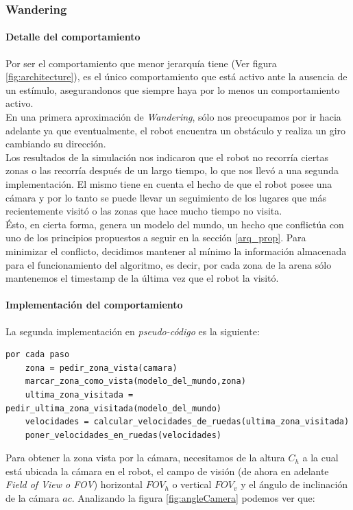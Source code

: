\subsubsection{Wandering}
\label{wandering}

\paragraph{Detalle del comportamiento} 
Por ser el comportamiento que menor jerarqu\'ia tiene (Ver figura
\ref{fig:architecture}), es el \'unico comportamiento que est\'a activo
ante la ausencia de un est\'imulo, asegurandonos que siempre haya por lo menos
un comportamiento activo.
\\
En una primera aproximaci\'on de \emph{Wandering}, s\'olo nos preocupamos por
ir hacia adelante ya que eventualmente, el robot encuentra un obst\'aculo y
realiza un giro cambiando su direcci\'on.
\\
Los resultados de la simulaci\'on nos indicaron que el robot no recorr\'ia
ciertas zonas o las recorr\'ia despu\'es de un largo tiempo, lo que nos llev\'o
a una segunda implementaci\'on. El mismo tiene en cuenta el hecho de que el
robot posee una c\'amara y por lo tanto se puede llevar un seguimiento de los
lugares que m\'as recientemente visit\'o o las zonas que hace mucho tiempo no
visita.
\\
\'Esto, en cierta forma, genera un modelo del mundo, un hecho que
conflict\'ua con uno de los principios propuestos a seguir en la secci\'on
\ref{arq_prop}. Para minimizar el conflicto, decidimos mantener al m\'inimo la
informaci\'on almacenada para el funcionamiento del algoritmo, es decir, por
cada zona de la arena s\'olo mantenemos el timestamp de la \'ultima vez que el
robot la visit\'o.

\paragraph{Implementaci\'on del comportamiento}

La segunda implementaci\'on en \emph{pseudo-c\'odigo} es la siguiente:
\begin{verbatim}
por cada paso
    zona = pedir_zona_vista(camara)
    marcar_zona_como_vista(modelo_del_mundo,zona)
    ultima_zona_visitada = pedir_ultima_zona_visitada(modelo_del_mundo)
    velocidades = calcular_velocidades_de_ruedas(ultima_zona_visitada)
    poner_velocidades_en_ruedas(velocidades)
\end{verbatim}
Para obtener la zona vista por la c\'amara, necesitamos de la altura $C_h$ a la
cual est\'a ubicada la c\'amara en el robot, el campo de visi\'on (de ahora en
adelante \emph{Field of View o FOV}) horizontal $FOV_h$ o vertical $FOV_v$ y
el \'angulo de inclinaci\'on de la c\'amara $ac$. Analizando la figura 
\ref{fig:angleCamera} podemos ver que:

